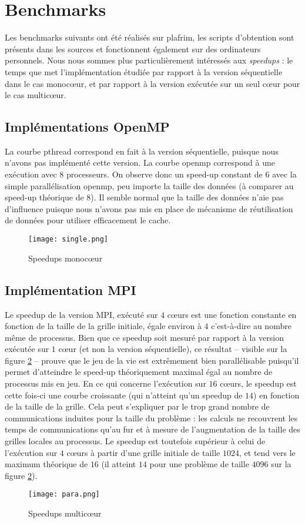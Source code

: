 \newpage
\section{Benchmarks}

Les benchmarks suivants ont été réalisés sur plafrim, les scripts d'obtention sont présents dans les sources et fonctionnent également sur des ordinateurs personnels. Nous nous sommes plus particulièrement intéressés aux \emph{speedups} : le temps que met l'implémentation étudiée par rapport à la version séquentielle dans le cas monoc\oe ur, et par rapport à la version exécutée sur un seul c\oe ur pour le cas multic\oe ur.



\subsection{Implémentations OpenMP}

La courbe pthread correspond en fait à la version séquentielle, puisque nous n'avons pas implémenté cette version. La courbe openmp correspond à une exécution avec 8 processeurs. On observe donc un speed-up constant de 6 avec la simple parallélisation openmp, peu importe la taille des données (à comparer au speed-up théorique de 8). Il semble normal que la taille des données n'aie pas d'influence puisque nous n'avons pas mis en place de mécanisme de réutilisation de données pour utiliser efficacement le cache.

\begin{figure}[!h]
\centering
\texttt{[image: single.png]}
\caption{Speedups monoc\oe ur}
\label{fig:single}
\end{figure}

\newpage
\subsection{Implémentation MPI}

Le speedup de la version MPI, exécuté sur $4$ c\oe urs est une fonction constante en fonction de la taille de la grille initiale, égale environ à $4$ c'est-à-dire au nombre même de processus. Bien que ce speedup soit mesuré par rapport à la version exécutée sur $1$ c\oe ur (et non la version séquentielle), ce résultat  -- visible sur la figure \ref{fig:para} -- prouve que le jeu de la vie est extrêmement bien parallélisable puisqu'il permet d'atteindre le speed-up théoriquement maximal égal au nombre de processus mis en jeu. En ce qui concerne l'exécution sur $16$ c\oe urs, le speedup est cette fois-ci une courbe croissante (qui n'atteint qu'un speedup de $14$) en fonction de la taille de la grille. Cela peut s'expliquer par le trop grand nombre de communications induites pour la taille du problème : les calculs ne recouvrent les temps de communications qu'au fur et à mesure de l'augmentation de la taille des grilles locales au processus. Le speedup est toutefois supérieur à celui de l'exécution sur $4$ c\oe urs à partir d'une grille initiale de taille $1024$, et tend vers le maximum théorique de $16$ (il atteint $14$ pour une problème de taille $4096$ sur la figure \ref{fig:para}).

\begin{figure}[!h]
\centering
\texttt{[image: para.png]}
\caption{Speedups multic\oe ur}
\label{fig:para}
\end{figure}